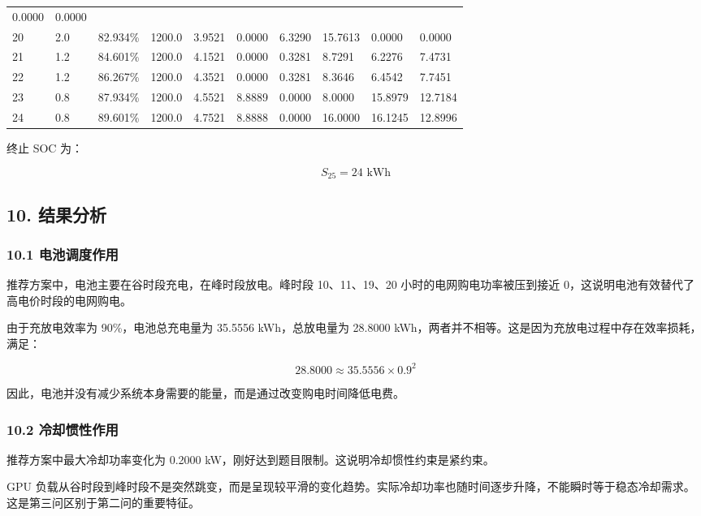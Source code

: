 \documentclass[
]{article}
\begin{document}
\begin{longtable}[]{@{}llllllllll@{}}
0.0000 & 0.0000 \\
20 & 2.0 & 82.934\% & 1200.0 & 3.9521 & 0.0000 & 6.3290 & 15.7613 &
0.0000 & 0.0000 \\
21 & 1.2 & 84.601\% & 1200.0 & 4.1521 & 0.0000 & 0.3281 & 8.7291 &
6.2276 & 7.4731 \\
22 & 1.2 & 86.267\% & 1200.0 & 4.3521 & 0.0000 & 0.3281 & 8.3646 &
6.4542 & 7.7451 \\
23 & 0.8 & 87.934\% & 1200.0 & 4.5521 & 8.8889 & 0.0000 & 8.0000 &
15.8979 & 12.7184 \\
24 & 0.8 & 89.601\% & 1200.0 & 4.7521 & 8.8888 & 0.0000 & 16.0000 &
16.1245 & 12.8996 \\
\end{longtable}

终止 SOC 为：

\[S_{25}=24\text{ kWh}\]

\subsection{10. 结果分析}\label{10-ux7ed3ux679cux5206ux6790}

\subsubsection{10.1
电池调度作用}\label{101-ux7535ux6c60ux8c03ux5ea6ux4f5cux7528}

推荐方案中，电池主要在谷时段充电，在峰时段放电。峰时段 10、11、19、20
小时的电网购电功率被压到接近
0，这说明电池有效替代了高电价时段的电网购电。

由于充放电效率为 90\%，电池总充电量为 35.5556 kWh，总放电量为 28.8000
kWh，两者并不相等。这是因为充放电过程中存在效率损耗，满足：

\[28.8000 \approx 35.5556\times0.9^2\]

因此，电池并没有减少系统本身需要的能量，而是通过改变购电时间降低电费。

\subsubsection{10.2
冷却惯性作用}\label{102-ux51b7ux5374ux60efux6027ux4f5cux7528}

推荐方案中最大冷却功率变化为 0.2000
kW，刚好达到题目限制。这说明冷却惯性约束是紧约束。

GPU
负载从谷时段到峰时段不是突然跳变，而是呈现较平滑的变化趋势。实际冷却功率也随时间逐步升降，不能瞬时等于稳态冷却需求。这是第三问区别于第二问的重要特征。
\end{document}
